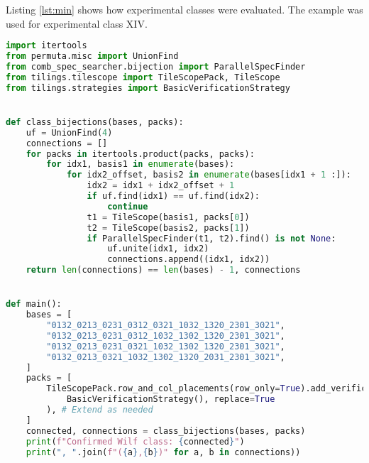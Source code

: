 \label{ch:expsetup}
Listing \ref{lst:min} shows how experimental classes were evaluated. The example was used for experimental class XIV.

\begin{lstlisting}[style=py,language=Python,caption={Experimental setup for evaluating experimental classes.},label={lst:exp}]
import itertools
from permuta.misc import UnionFind
from comb_spec_searcher.bijection import ParallelSpecFinder
from tilings.tilescope import TileScopePack, TileScope
from tilings.strategies import BasicVerificationStrategy


def class_bijections(bases, packs):
    uf = UnionFind(4)
    connections = []
    for packs in itertools.product(packs, packs):
        for idx1, basis1 in enumerate(bases):
            for idx2_offset, basis2 in enumerate(bases[idx1 + 1 :]):
                idx2 = idx1 + idx2_offset + 1
                if uf.find(idx1) == uf.find(idx2):
                    continue
                t1 = TileScope(basis1, packs[0])
                t2 = TileScope(basis2, packs[1])
                if ParallelSpecFinder(t1, t2).find() is not None:
                    uf.unite(idx1, idx2)
                    connections.append((idx1, idx2))
    return len(connections) == len(bases) - 1, connections


def main():
    bases = [
        "0132_0213_0231_0312_0321_1032_1320_2301_3021",
        "0132_0213_0231_0312_1032_1302_1320_2301_3021",
        "0132_0213_0231_0321_1032_1302_1320_2301_3021",
        "0132_0213_0321_1032_1302_1320_2031_2301_3021",
    ]
    packs = [
        TileScopePack.row_and_col_placements(row_only=True).add_verification(
            BasicVerificationStrategy(), replace=True
        ), # Extend as needed
    ]
    connected, connections = class_bijections(bases, packs)
    print(f"Confirmed Wilf class: {connected}")
    print(", ".join(f"({a},{b})" for a, b in connections))
\end{lstlisting}

